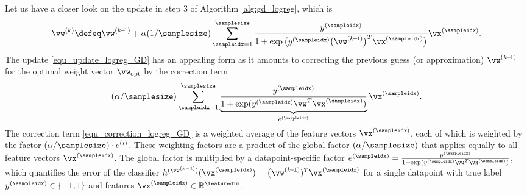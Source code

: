 \documentclass[12pt]{report}
\begin{document}
Let us have a closer look on the update in step $3$ of Algorithm \ref{alg:gd_logreg}, which is 
\begin{equation}
\label{equ_update_logreg_GD}
\vw^{(k)} \defeq \vw^{(k\!-\!1)} + \alpha (1/\samplesize) \sum_{\sampleidx=1}^{\samplesize} \frac{y^{(\sampleidx)}}{1 + \exp \big( y^{(\sampleidx)} \big( \vw^{(k\!-\!1)}  \big)^{T} \vx^{(\sampleidx)}\big)} \vx^{(\sampleidx)}. 
\end{equation}
The update \eqref{equ_update_logreg_GD} has an appealing form as it amounts to correcting the previous 
guess (or approximation) $\vw^{(k\!-\!1)}$ for the optimal weight vector $\vw_{\rm opt}$ by the correction term 
\begin{equation}
\label{equ_correction_logreg_GD}
(\alpha/\samplesize) \sum_{\sampleidx=1}^{\samplesize} \underbrace{ \frac{y^{(\sampleidx)}}{1 + \exp ( y^{(\sampleidx)} \vw^{T} \vx^{(\sampleidx)})}}_{e^{(\sampleidx)}} \vx^{(\sampleidx)}. 
\end{equation}
The correction term \eqref{equ_correction_logreg_GD} is a weighted average 
of the feature vectors $\vx^{(\sampleidx)}$, each of which is weighted by the 
factor $(\alpha/\samplesize) \cdot e^{(i)}$. These weighting factors are a product 
of the global factor $(\alpha/\samplesize)$ that applies equally to all feature vectors 
$\vx^{(\sampleidx)}$. The global factor is multiplied by a datapoint-specific factor 
$e^{(\sampleidx)} =  \frac{y^{(\sampleidx)}}{1 + \exp ( y^{(\sampleidx)} \vw^{T} \vx^{(\sampleidx)})}$, 
which quantifies the error of the classifier  $h^{(\vw^{(k-1)})}(\vx^{(\sampleidx)}) =   \big(\vw^{(k\!-\!1)})^{T} \vx^{(\sampleidx)}$ 
for a single datapoint with true label $y^{(\sampleidx)} \in \{-1,1\}$ and features $\vx^{(\sampleidx)} \in \mathbb{R}^{\featuredim}$. 
\end{document}
